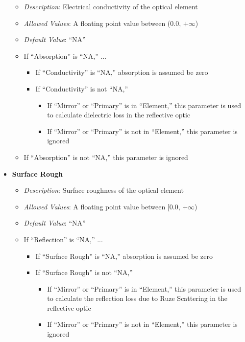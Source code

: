 \documentclass[11pt]{article} %
\begin{document}
\begin{itemize}[noitemsep,topsep=0pt]
\begin{itemize}[noitemsep,topsep=0pt]
		\item \textit{Description}: Electrical conductivity of the optical element 
		\item \textit{Allowed Values}: A floating point value between (0.0, $+\infty$)
		\item \textit{Default Value}: ``NA''
		\item If ``Absorption'' is ``NA,'' ... 
			\begin{itemize}[noitemsep,topsep=0pt]
			\item If ``Conductivity'' is ``NA,'' absorption is assumed be zero
			\item If ``Conductivity'' is not ``NA,'' 
				\begin{itemize}
				\item If ``Mirror'' or ``Primary'' is in ``Element,'' this parameter is used to calculate dielectric loss in the reflective optic
				\item If ``Mirror'' or ``Primary'' is not in ``Element,'' this parameter is ignored
				\end{itemize}
			\end{itemize}
		\item If ``Absorption'' is not ``NA,'' this parameter is ignored		
		\end{itemize}
	\item \textbf{Surface Rough}
		\begin{itemize}[noitemsep,topsep=0pt]
		\item \textit{Description}: Surface roughness of the optical element 
		\item \textit{Allowed Values}: A floating point value between [0.0, +$\infty$) 
		\item \textit{Default Value}: ``NA''
		\item If ``Reflection'' is ``NA,'' ... 
			\begin{itemize}[noitemsep,topsep=0pt]
			\item If ``Surface Rough'' is ``NA,'' absorption is assumed be zero
			\item If ``Surface Rough'' is not ``NA,'' 
				\begin{itemize}[noitemsep,topsep=0pt]
				\item If ``Mirror'' or ``Primary'' is in ``Element,'' this parameter is used to calculate the reflection loss due to Ruze Scattering in the reflective optic
				\item If ``Mirror'' or ``Primary'' is not in ``Element,'' this parameter is ignored
				\end{itemize}

\end{itemize}
\end{itemize}
\end{itemize}
\end{document}
